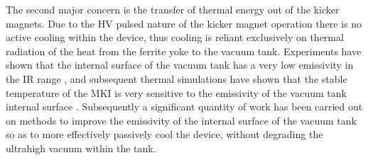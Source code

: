 The second major concern is the transfer of thermal energy out of the kicker magnets. Due to the HV pulsed nature of the kicker magnet operation there is no active cooling within the device, thus cooling is reliant exclusively on thermal radiation of the heat from the ferrite yoke to the vacuum tank. Experiments have shown that the internal surface of the vacuum tank has a very low emissivity in the IR range \cite{Barnes:emisMKI}, and subsequent thermal simulations have shown that the stable temperature of the MKI is very sensitive to the emissivity of the vacuum tank internal surface \cite{Garlasche:2dHeatEmis}. Subsequently a significant quantity of work has been carried out on methods to improve the emissivity of the internal surface of the vacuum tank so as to more effectively passively cool the device, without degrading the ultrahigh vacuum within the tank.